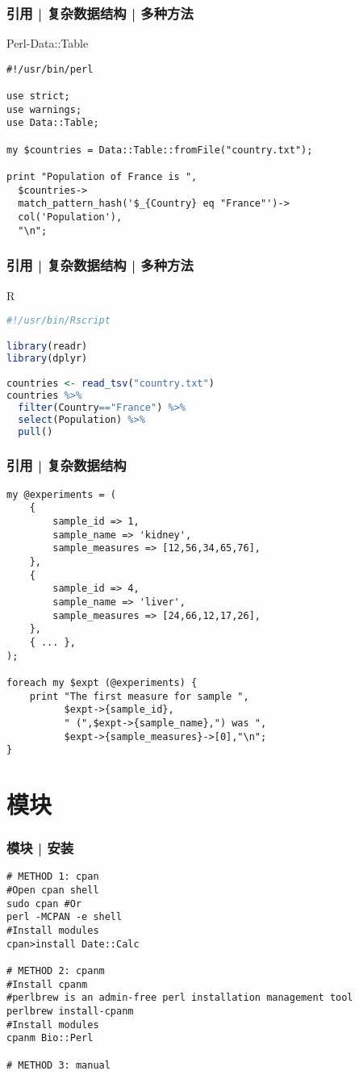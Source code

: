 \begin{frame}[fragile]
  \frametitle{引用 | 复杂数据结构 | 多种方法}
  \begin{block}{Perl-Data::Table}
\begin{lstlisting}[basicstyle=\small\tt]
#!/usr/bin/perl

use strict;
use warnings;
use Data::Table;

my $countries = Data::Table::fromFile("country.txt");

print "Population of France is ",
  $countries->
  match_pattern_hash('$_{Country} eq "France"')->
  col('Population'),
  "\n";
\end{lstlisting}
  \end{block}
\end{frame}

\begin{frame}[fragile]
  \frametitle{引用 | 复杂数据结构 | 多种方法}
  \begin{block}{R}
\begin{lstlisting}[language=r]
#!/usr/bin/Rscript

library(readr)
library(dplyr)

countries <- read_tsv("country.txt")
countries %>% 
  filter(Country=="France") %>% 
  select(Population) %>%
  pull()
\end{lstlisting}
  \end{block}
\end{frame}

\begin{frame}[fragile]
  \frametitle{引用 | 复杂数据结构}
  \vspace{-0.8em}
\begin{lstlisting}[basicstyle=\footnotesize\tt,numberstyle=\scriptsize]
my @experiments = (
    {
        sample_id => 1,
        sample_name => 'kidney',
        sample_measures => [12,56,34,65,76],
    },
    {
        sample_id => 4,
        sample_name => 'liver',
        sample_measures => [24,66,12,17,26],
    },
    { ... },
);

foreach my $expt (@experiments) {
    print "The first measure for sample ",
          $expt->{sample_id},
          " (",$expt->{sample_name},") was ",
          $expt->{sample_measures}->[0],"\n";
}
\end{lstlisting}
\end{frame}

\section{模块}
\begin{frame}[fragile]
  \frametitle{模块 | 安装}
  \vspace{-0.6em}
\begin{lstlisting}
# METHOD 1: cpan
#Open cpan shell
sudo cpan #Or
perl -MCPAN -e shell
#Install modules
cpan>install Date::Calc

# METHOD 2: cpanm
#Install cpanm
#perlbrew is an admin-free perl installation management tool
perlbrew install-cpanm
#Install modules
cpanm Bio::Perl

# METHOD 3: manual
\end{lstlisting}
\end{frame}

